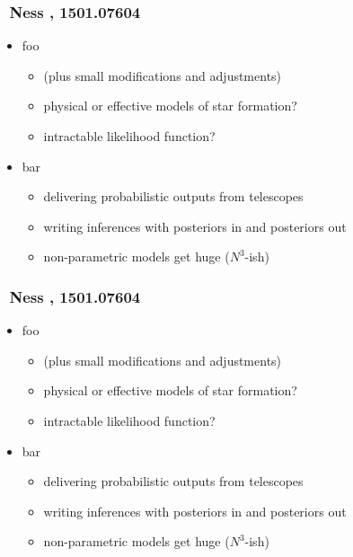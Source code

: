 \documentclass[pdftex]{beamer}
\begin{document}
\begin{frame}
  \frametitle{\tc~{\footnotesize Ness \etal, 1501.07604}}
  \begin{itemize}
  \item foo
    \begin{itemize}
    \item (plus small modifications and adjustments)
    \item physical or effective models of star formation?
    \item intractable likelihood function?
    \end{itemize}
  \item bar
    \begin{itemize}
    \item delivering probabilistic outputs from telescopes
    \item writing inferences with posteriors in and posteriors out
    \item non-parametric models get huge ($N^3$-ish)
    \end{itemize}
  \end{itemize}
\end{frame}

\begin{frame}
  \frametitle{\tc~{\footnotesize Ness \etal, 1501.07604}}
  \begin{itemize}
  \item foo
    \begin{itemize}
    \item (plus small modifications and adjustments)
    \item physical or effective models of star formation?
    \item intractable likelihood function?
    \end{itemize}
  \item bar
    \begin{itemize}
    \item delivering probabilistic outputs from telescopes
    \item writing inferences with posteriors in and posteriors out
    \item non-parametric models get huge ($N^3$-ish)
    \end{itemize}
  \end{itemize}
\end{frame}

\messages
\end{document}
